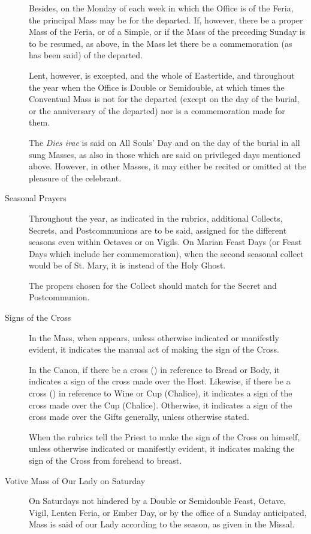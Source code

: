 \begin{description}
    Besides, on the Monday of each week in which the Office is of the Feria, the principal Mass may be for the departed. If, however, there be a proper Mass of the Feria, or of a Simple, or if the Mass of the preceding Sunday is to be resumed, as above, in the Mass let there be a commemoration (as has been said) of the departed.\par
    Lent, however, is excepted, and the whole of Eastertide, and throughout the year when the Office is Double or Semidouble, at which times the Conventual Mass is not for the departed (except on the day of the burial, or the anniversary of the departed) nor is a commemoration made for them.\par
    The \emph{Dies irae} is said on All Souls' Day and on the day of the burial in all sung Masses, as also in those which are said on privileged days mentioned above. However, in other Masses, it may either be recited or omitted at the pleasure of the celebrant.
    \item[Seasonal Prayers] Throughout the year, as indicated in the rubrics, additional Collects, Secrets, and Postcommunions are to be said, assigned for the different seasons even within Octaves or on Vigils. On Marian Feast Days (or Feast Days which include her commemoration), when the second seasonal collect would be of St. Mary, it is instead of the Holy Ghost.\par
    The propers chosen for the Collect should match for the Secret and Postcommunion.
    \item[Signs of the Cross] In the Mass, when {} appears, unless otherwise indicated or manifestly evident, it indicates the manual act of making the sign of the Cross.\par
    In the Canon, if there be a cross ({}) in reference to Bread or Body, it indicates a sign of the cross made over the Host. Likewise, if there be a cross ({}) in reference to Wine or Cup (Chalice), it indicates a sign of the cross made over the Cup (Chalice). Otherwise, it indicates a sign of the cross made over the Gifts generally, unless otherwise stated.\par
    When the rubrics tell the Priest to make the sign of the Cross on himself, unless otherwise indicated or manifestly evident, it indicates making the sign of the Cross from forehead to breast.
    \item[Votive Mass of Our Lady on Saturday] On Saturdays not hindered by a Double or Semidouble Feast, Octave, Vigil, Lenten Feria, or Ember Day, or by the office of a Sunday anticipated, Mass is said of our Lady according to the season, as given in the Missal.\par
\end{description}
